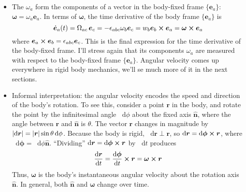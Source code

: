 \documentclass[11pt, a4paper]{article}
\newcommand{\diff}{\mathop{}\!\mathrm{d}} %
\newcommand{\e}{\bm{e}} %
\newcommand{\uvec}[1]{\hat{\mathbf{#1}}}
\begin{document}
\begin{itemize}
	\item The $ \omega_{a} $ form the components of a vector in the body-fixed frame $ \{\e_{a} \} $: $ \bm{\omega} = \omega_{a} \e_{a} $.  In terms of $ \bm{\omega} $, the time derivative of the body frame $ \{\e_{a} \} $ is
	\begin{equation*}
		\dot{\e}_{a}(t) = \operatorname{\Omega}_{ac} \e_{c} = - \epsilon_{abc} \omega_{b} \e_{c} = w_{b}\e_{b} \cross \e_{a} = \bm{\omega} \cross \bm{e}_{a}
	\end{equation*}
	where $ \e_{a} \cross \e_{b} = \epsilon_{abc} \e_{c} $. This is the final expression for the time derivative of the body-fixed frame. I'll stress again that its components $\omega_{a}$ are measured with respect to the body-fixed frame $ \{\e_{a} \} $. Angular velocity comes up everywhere in rigid body mechanics, we'll se much more of it in the next sections.
	
	\item Informal interpretation: the angular velocity encodes the speed and direction of the body's rotation. To see this, consider a point $ \bm{r} $ in the body, and rotate the point by the infinitesimal angle $ \diff \phi $ about the fixed axis $ \uvec{n} $, where the angle between $ \bm{r} $ and $ \uvec{n} $ is $ \theta $. The vector $ \bm{r} $ changes in magnitude by $ \abs{\diff \bm{r}} = \abs{\bm{r}} \sin \theta \diff \phi $. Because the body is rigid, $ \diff \bm{r} \perp \bm{r}$, so $ \diff \bm{r} = \diff \bm{\phi} \cross \bm{r} $, where $ \diff \bm{\phi} = \diff \phi \uvec{n} $. ``Dividing'' $ \diff \bm{r} = \diff \bm{\phi} \cross \bm{r} $ by $ \diff t $ produces
	\begin{equation*}
		\dv{\bm{r}}{t} = \dv{\bm{\phi}}{t} \cross \bm{r} = \bm{\omega} \cross \bm{r}
	\end{equation*}
	Thus, $ \bm{\omega} $ is the body's instantaneous angular velocity about the rotation axis $ \uvec{n} $. In general, both $ \uvec{n} $ and $ \bm{\omega} $ change over time.

\end{itemize}
\end{document}
